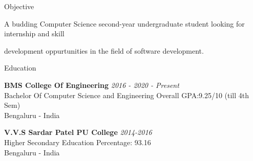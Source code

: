 \documentclass{resume} %
\begin{document}


\begin{rSection}{Objective} \itemsep -2pt
\item A budding Computer Science second-year undergraduate student looking for internship and skill 
\item development oppurtunities in the field of software development.
\end{rSection}

\begin{rSection}{Education}

{\bf BMS College Of Engineering} \hfill {\em 2016 - 2020 - Present} 
\\  Bachelor Of Computer Science and Engineering \hfill { Overall GPA:9.25/10 (till 4th Sem)}
\\ Bengaluru - India

{\bf V.V.S Sardar Patel PU College} \hfill {\em 2014-2016} 
\\  Higher Secondary Education \hfill {Percentage: 93.16 }
\\ Bengaluru - India


\end{rSection}

\end{document}
